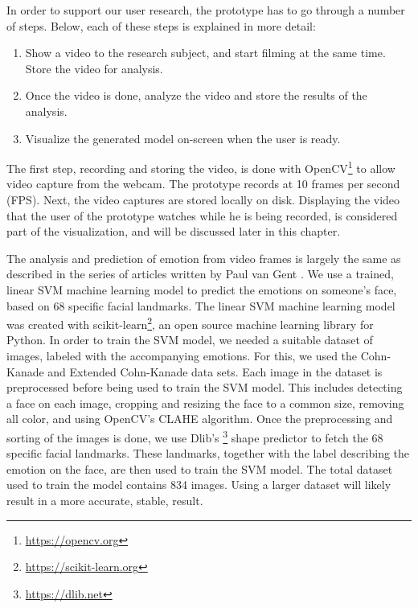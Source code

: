 \documentclass[sigconf]{acmart}
\begin{document}
In order to support our user research, the prototype has to go through a number of steps. Below, each of these
steps is explained in more detail:
\begin{enumerate}
    \item{Show a video to the research subject, and start filming at the same time. Store the video for analysis.}
    \item{Once the video is done, analyze the video and store the results of the analysis.}
    \item{Visualize the generated model on-screen when the user is ready.}
\end{enumerate}

The first step, recording and storing the video, is done with OpenCV\footnote{\url{https://opencv.org}}
to allow video capture from the webcam. The prototype records at 10 frames per second (FPS).
Next, the video captures are stored locally on disk.
Displaying the video that the user of the prototype watches while he is being recorded, is considered part of
the visualization, and will be discussed later in this chapter.

The analysis and prediction of emotion from video frames is largely the same as described in the series of
articles written by Paul van Gent \cite{gent2016landmarks}. We use a trained, linear SVM machine learning model
to predict the emotions on someone's face, based on 68 specific facial landmarks. The linear SVM machine learning
model was created with scikit-learn\footnote{\url{https://scikit-learn.org}}, an open source machine learning library
for Python. In order to train the SVM model, we needed a suitable dataset of images, labeled with the
accompanying emotions. For this, we used the Cohn-Kanade and Extended Cohn-Kanade
\cite{kanade2000comprehensive, lucey2010extended} data sets.
Each image in the dataset is preprocessed before being used to train the SVM model. This includes detecting
a face on each image, cropping and resizing the face to a common size, removing all color, and using OpenCV's
CLAHE algorithm. Once the preprocessing and sorting of the images is done, we use Dlib's
\footnote{\url{https://dlib.net}} shape predictor to fetch the 68 specific facial landmarks. These landmarks,
together with the label describing the emotion on the face, are then used to train the SVM model. The total
dataset used to train the model contains 834 images. Using a larger dataset will likely result in a more accurate,
stable, result.
\end{document}
